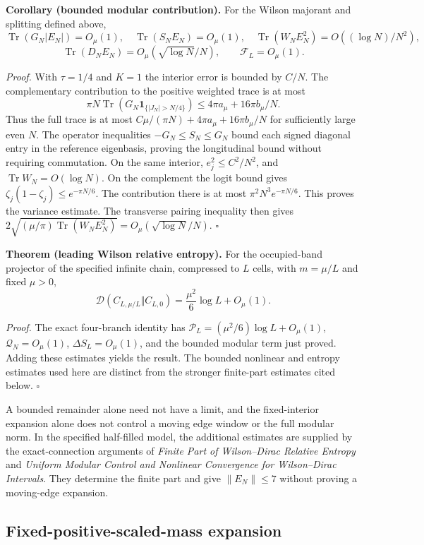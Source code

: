 \documentclass[
  10pt,
  a4paper,
]{article}
\begin{document}
\textbf{Corollary (bounded modular contribution).} For the Wilson majorant and splitting defined above, \[
\operatorname{Tr}(G_N|E_N|)=O_\mu(1),\quad
\operatorname{Tr}(S_NE_N)=O_\mu(1),\quad
\operatorname{Tr}(W_NE_N^2)=O((\log N)/N^2),
\] \[
\operatorname{Tr}(D_NE_N)=O_\mu(\sqrt{\log N}/N),\qquad
\mathcal F_L=O_\mu(1).
\]

\emph{Proof.} With \(\tau=1/4\) and \(K=1\) the interior error is bounded by \(C/N\). The complementary contribution to the positive weighted trace is at most \[
\pi N\operatorname{Tr}(G_N\mathbf1_{\{|J_N|>N/4\}})
\le4\pi a_\mu+16\pi b_\mu/N.
\] Thus the full trace is at most \(C\mu/(\pi N)+4\pi a_\mu+16\pi b_\mu/N\) for sufficiently large even \(N\). The operator inequalities \(-G_N\le S_N\le G_N\) bound each signed diagonal entry in the reference eigenbasis, proving the longitudinal bound without requiring commutation. On the same interior, \(e_j^2\le C^2/N^2\), and \(\operatorname{Tr}W_N=O(\log N)\). On the complement the logit bound gives \(\zeta_j(1-\zeta_j)\le e^{-\pi N/6}\). The contribution there is at most \(\pi^2N^3e^{-\pi N/6}\). This proves the variance estimate. The transverse pairing inequality then gives \(2\sqrt{(\mu/\pi)\operatorname{Tr}(W_NE_N^2)}=O_\mu(\sqrt{\log N}/N)\). \(\square\)

\textbf{Theorem (leading Wilson relative entropy).} For the occupied-band projector of the specified infinite chain, compressed to \(L\) cells, with \(m=\mu/L\) and fixed \(\mu>0\), \[
\boxed{\mathcal D(C_{L,\mu/L}\Vert C_{L,0})
=\frac{\mu^2}{6}\log L+O_\mu(1).}
\]

\emph{Proof.} The exact four-branch identity has \(\mathcal P_L=(\mu^2/6)\log L+O_\mu(1)\), \(\mathcal Q_N=O_\mu(1)\), \(\Delta S_L=O_\mu(1)\), and the bounded modular term just proved. Adding these estimates yields the result. The bounded nonlinear and entropy estimates used here are distinct from the stronger finite-part estimates cited below. \(\square\)

A bounded remainder alone need not have a limit, and the fixed-interior expansion alone does not control a moving edge window or the full modular norm. In the specified half-filled model, the additional estimates are supplied by the exact-connection arguments of \emph{Finite Part of Wilson--Dirac Relative Entropy} and \emph{Uniform Modular Control and Nonlinear Convergence for Wilson--Dirac Intervals}. They determine the finite part and give \(\|E_N\|\le7\) without proving a moving-edge expansion.

\subsection{Fixed-positive-scaled-mass expansion}\label{fixed-positive-scaled-mass-expansion}
\end{document}
